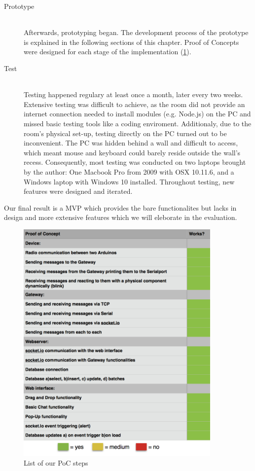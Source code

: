 \begin{description}
	\item [Prototype]\hfill \\
		 Afterwards, prototyping began. 
		 The development process of the prototype is explained in the following sections of this chapter.
	    Proof of Concepts were designed for each stage of the implementation (\ref{fig:PoC}).
	\item [Test]\hfill \\
		  Testing happened regulary at least once a month, later every two weeks.
		Extensive testing was difficult to achieve, as the room did not provide 
		   an internet connection needed to install modules (e.g. Node.js) on the PC 
		   and missed basic testing tools like a coding enviroment. 
		   Additionaly, due to the room's physical set-up, testing directly on the PC turned out 
		   to be inconvenient. The PC was hidden behind a wall and difficult to access, 
		   which meant mouse and keyboard could barely reside outside the wall's recess.
		   Consequently, most testing was conducted on two laptops brought by the author: 
		   One Macbook Pro from 2009 with OSX 10.11.6, and a Windows laptop with Windows 10 installed.
		   Throughout testing, new features were designed and iterated.
\end{description}

Our final result is a MVP %
which provides the bare functionalites but lacks in design 
and more extensive features which we will eleborate in the evaluation.

\begin{figure}[th]
	\centering
	\includegraphics[width=100mm,scale=1]{Figures/PoC}
	\decoRule
	\caption[PoC]{List of our PoC steps}
	\label{fig:PoC}
\end{figure}


